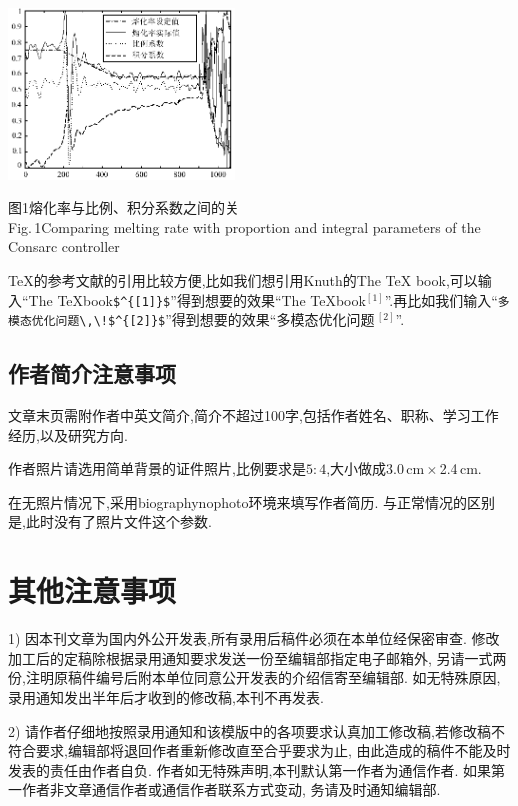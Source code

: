 \documentclass{Style/aas}
\begin{document}
\begin{multicols}{2}
\begin{center}
{{        \centerline{\includegraphics[width=6cm]{Image/01.eps}}
        \vskip 1mm{\small
            图1\quad 熔化率与比例、积分系数之间的关
            \\
            Fig.\,1\quad Comparing melting rate with proportion and integral parameters of the Consarc controller }
      }
    }
  \end{center}






  \TeX 的参考文献的引用比较方便,比如我们想引用Knuth的The \TeX
  book,可以输入``The \TeX book\verb|$^{[1]}$|''得到想要的效果``The
  \TeX book$^{[1]}$''.再比如我们输入``\verb|多模态优化问题\,\!$^{[2]}$|''得到想要的效果``多模态优化问题\,\!$^{[2]}$''.

  \subsection{作者简介注意事项}

  文章末页需附作者中英文简介,简介不超过100字,包括作者姓名、职称、学习工作经历,以及研究方向.


  作者照片请选用简单背景的证件照片,比例要求是$5:4$,大小做成3.0\,cm\,$\times$\,2.4\,cm.

  在无照片情况下,采用biographynophoto环境来填写作者简历.
  与正常情况的区别是,此时没有了照片文件这个参数.

  \section{其他注意事项}

  1) 因本刊文章为国内外公开发表,所有录用后稿件必须在本单位经保密审查.
  修改加工后的定稿除根据录用通知要求发送一份至编辑部指定电子邮箱外,
  另请一式两份,注明原稿件编号后附本单位同意公开发表的介绍信寄至编辑部.
  如无特殊原因,录用通知发出半年后才收到的修改稿,本刊不再发表.

  2)
  请作者仔细地按照录用通知和该模版中的各项要求认真加工修改稿,若修改稿不符合要求,编辑部将退回作者重新修改直至合乎要求为止,
  由此造成的稿件不能及时发表的责任由作者自负.
  作者如无特殊声明,本刊默认第一作者为通信作者.
  如果第一作者非文章通信作者或通信作者联系方式变动,
  务请及时通知编辑部.


\end{multicols}%
\end{document}
